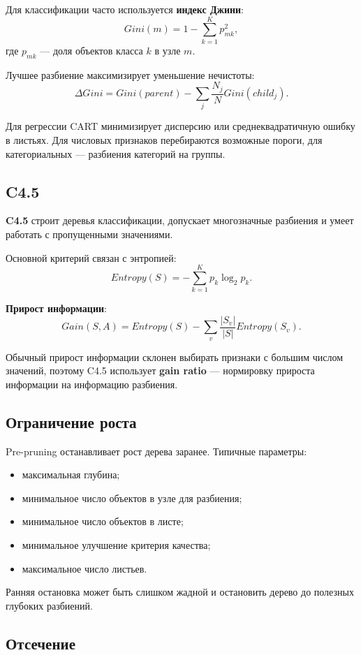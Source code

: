 Для классификации часто используется \textbf{индекс Джини}:
\[
Gini(m)=1-\sum_{k=1}^{K}p_{mk}^2,
\]
где $p_{mk}$ --- доля объектов класса $k$ в узле $m$.

Лучшее разбиение максимизирует уменьшение нечистоты:
\[
\Delta Gini=Gini(parent)-\sum_j\frac{N_j}{N}Gini(child_j).
\]

Для регрессии CART минимизирует дисперсию или среднеквадратичную ошибку в листьях. Для числовых признаков перебираются возможные пороги, для категориальных --- разбиения категорий на группы.

\subsection*{C4.5}

\textbf{C4.5} строит деревья классификации, допускает многозначные разбиения и умеет работать с пропущенными значениями.

Основной критерий связан с энтропией:
\[
Entropy(S)=-\sum_{k=1}^{K}p_k\log_2 p_k.
\]

\textbf{Прирост информации}:
\[
Gain(S,A)=Entropy(S)-\sum_{v}\frac{|S_v|}{|S|}Entropy(S_v).
\]

Обычный прирост информации склонен выбирать признаки с большим числом значений, поэтому C4.5 использует \textbf{gain ratio} --- нормировку прироста информации на информацию разбиения.

\subsection*{Ограничение роста}

Pre-pruning останавливает рост дерева заранее. Типичные параметры:
\begin{itemize}
    \item максимальная глубина;
    \item минимальное число объектов в узле для разбиения;
    \item минимальное число объектов в листе;
    \item минимальное улучшение критерия качества;
    \item максимальное число листьев.
\end{itemize}

Ранняя остановка может быть слишком жадной и остановить дерево до полезных глубоких разбиений.

\subsection*{Отсечение}

